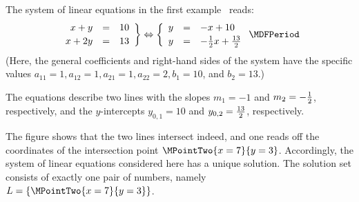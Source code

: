 \begin{MIntro}
\begin{MExample}
The system of linear equations in the first example~ reads:
$$\left. \begin{array}{rcl} x + y & = & 10 \\[.5ex] x + 2 y & = & 13 \end{array} \right\} \Leftrightarrow
\left\{ \begin{array}{rcl} y & = & - x + 10 \\[.5ex] y & = & - \Mtfrac12 x + \Mtfrac{13}{2} \end{array} \right. \MDFPeriod$$
(Here, the general coefficients and right-hand sides of the system 
have the specific values $a_{11} = 1, a_{12} = 1, a_{21} = 1, a_{22} = 2, b_1 = 10$, and $b_2 = 13$.)

The equations describe two lines with the slopes $m_{1} = - 1$ and $m_{2} = - \tfrac{1}{2}$, respectively,
and the $y$-intercepts $y_{0,1} = 10$ and $y_{0,2} = \tfrac{13}{2}$, respectively.

\begin{center}
%
\end{center}
The figure shows that the two lines intersect indeed, and one reads off the coordinates 
of the intersection point $\MPointTwo{x = 7}{y = 3}$. Accordingly, the system of 
linear equations considered here has a unique solution. The solution set consists 
of exactly one pair of numbers, namely ${\ML} = \{ \MPointTwo{x = 7}{y = 3} \}$.
\end{MExample}


\end{MIntro}
